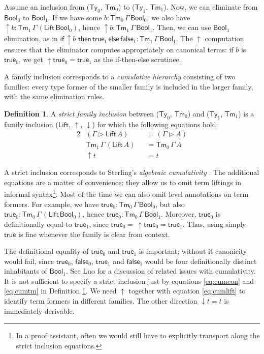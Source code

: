 \documentclass[a4paper,UKenglish,cleveref, autoref, thm-restate]{lipics-v2021}
\theoremstyle{remark}
\theoremstyle{definition}
\newtheorem{mydefinition}{Definition}
\newcommand{\Ty}{\mathsf{Ty}}
\newcommand{\Tm}{\mathsf{Tm}}
\newcommand{\ext}{\triangleright}
\newcommand{\Bool}{\mathsf{Bool}}
\newcommand{\true}{\mathsf{true}}
\newcommand{\false}{\mathsf{false}}
\newcommand{\up}{{\uparrow}}
\newcommand{\down}{{\downarrow}}
\newcommand{\Lift}{\mathsf{Lift}}
\begin{document}
Assume an inclusion from ($\Ty_0$, $\Tm_0$) to ($\Ty_1$, $\Tm_1$). Now, we can
eliminate from $\Bool_0$ to $\Bool_1$. If we have some $b :
\Tm_0\,\Gamma\,\Bool_0$, we also have $\up b :
\Tm_1\,\Gamma\,(\Lift\,\Bool_0)$, hence $\up b :
\Tm_1\,\Gamma\,\Bool_1$. Then, we can use $\Bool_1$ elimination, as in
$\mathsf{if}\,\up b\,\,\mathsf{then}\,\true_1\,\mathsf{else}\,\false_1 :
\Tm_1\,\Gamma\,\Bool_1$. The $\up$ computation ensures that the eliminator
computes appropriately on canonical terms: if $b$ is $\true_0$, we get
$\up \true_0 = \true_1$ as the if-then-else scrutinee.

A family inclusion corresponds to a \emph{cumulative hierarchy} consisting of
two families: every type former of the smaller family is included in the larger
family, with the same elimination rules.

\begin{mydefinition}\label{def:strict_inclusion}
A \emph{strict family inclusion} between ($\Ty_0$, $\Tm_0$) and ($\Ty_1$,
$\Tm_1$) is a family inclusion ($\Lift$, $\up$, $\down$) for which the following equations hold:
\begin{alignat}{2}
  & (\Gamma \ext \Lift\,A) &&= (\Gamma \ext A)     \label{eq:cumcon}    \\
  & \Tm_1\,\Gamma\,(\Lift\,A) &&= \Tm_0\,\Gamma\,A  \label{eq:cumtm}     \\
  & \up t &&= t                                    \label{eq:cumlift}
\end{alignat}
\end{mydefinition}

A strict inclusion corresponds to Sterling's \emph{algebraic cumulativity}
\cite{sterling2019algebraic}. The additional equations are a matter of
convenience: they allow us to omit term liftings in informal syntax\footnote{In
  a proof assistant, often we would still have to explicitly transport along the
  strict inclusion equations.}. Most of the time we can also omit level
annotations on term formers. For example, we have $\true_0 :
\Tm_0\,\Gamma\,\Bool_0$, but also $\true_0 : \Tm_0\,\Gamma\,(\Lift\,\Bool_0)$,
hence $\true_0 : \Tm_0\,\Gamma\,\Bool_1$. Moreover, $\true_0$ is definitionally
equal to $\true_1$, since $\true_0 =\,\up \true_0 = \true_1$. Thus, using
simply $\true$ is fine whenever the family is clear from context.

The definitional equality of $\true_0$ and $\true_1$ is important; without it
canonicity would fail, since $\true_0$, $\false_0$, $\true_1$ and $\false_1$
would be four definitionally distinct inhabitants of $\Bool_1$. See Luo
\cite{luo2012notes} for a discussion of related issues with cumulativity. It is
not sufficient to specify a strict inclusion just by equations \ref{eq:cumcon}
and \ref{eq:cumtm} in Definition \ref{def:strict_inclusion}. We need $\up$
together with equation \ref{eq:cumlift} to identify term formers in different
families. The other direction $\down t = t$ is immediately derivable.
\end{document}
